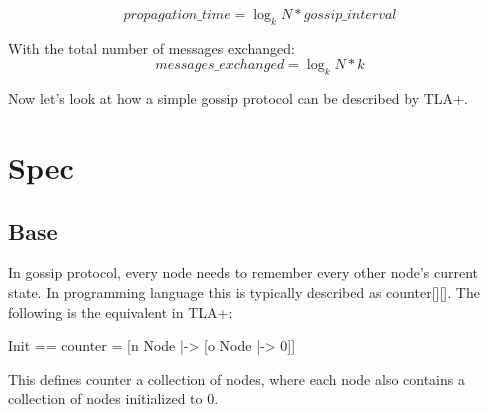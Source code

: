 \documentclass{report}
\begin{document}
\begin{equation} 
    propagation\_time = \log_k N * gossip\_interval
\end{equation}

With the total number of messages exchanged: 
\begin{equation} 
    messages\_exchanged = \log_k N * k
\end{equation}

Now let's look at how a simple gossip protocol can be described by TLA+.

\section{Spec}

\subsection{Base}

In gossip protocol, every node needs to remember every other node's current
state. In programming language this is typically described as counter[][]. The following is
the equivalent in TLA+: 
\begin{tla}
    Init == counter = [n \in Node |-> [o \in Node |-> 0]] 
\end{tla}
\begin{tlatex}
\end{tlatex}

This defines counter a collection of nodes, where each node also contains a
collection of nodes initialized to 0.\newline
\end{document}
